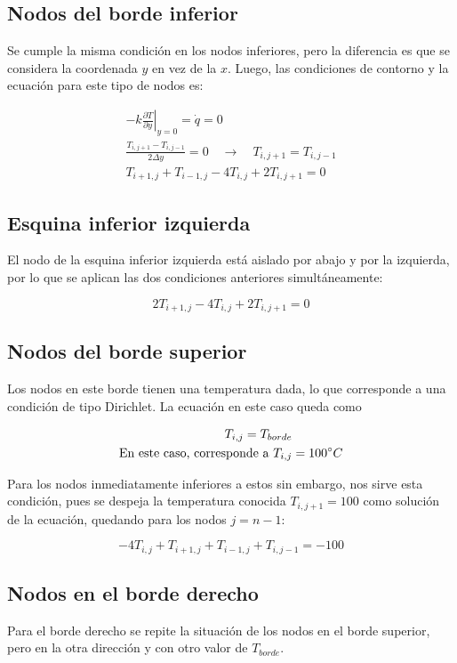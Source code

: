 \documentclass[12pt, notitlepage]{article}
\begin{document}
\subsection{Nodos del borde inferior}
Se cumple la misma condición en los nodos inferiores, pero la diferencia es que se considera la coordenada $y$ en vez de la $x$. Luego, las condiciones de contorno y la ecuación para este tipo de nodos es:

\begin{gather*}
-k\left.\frac{\partial T}{\partial y}\right|_{y = 0} = \dot{q} = 0 \\
\frac{T_{i,j+1} - T_{i,j-1}}{2\Delta y} = 0 \quad \longrightarrow\quad T_{i,j+1} = T_{i,j-1}\\
T_{i+1,j} + T_{i-1,j} - 4T_{i,j} + 2T_{i,j+1} = 0
\end{gather*}

\subsection{Esquina inferior izquierda}
El nodo de la esquina inferior izquierda está aislado por abajo y por la izquierda, por lo que se aplican las dos condiciones anteriores simultáneamente:

\begin{equation*}
2T_{i+1,j} - 4T_{i,j} + 2T_{i,j+1} = 0
\end{equation*}

\subsection{Nodos del borde superior}
Los nodos en este borde tienen una temperatura dada, lo que corresponde a una condición de tipo Dirichlet. La ecuación en este caso queda como

\begin{align*}
T_{i,j} = T_{borde}&\\
\text{En este caso, corresponde a}\ T_{i,j} &= 100\degree C
\end{align*}

Para los nodos inmediatamente inferiores a estos sin embargo, nos sirve esta condición, pues se despeja la temperatura conocida $T_{i,j+1} = 100$ como solución de la ecuación, quedando para los nodos $j=n-1$:

\begin{equation*}
-4T_{i,j} + T_{i+1,j} + T_{i-1,j} + T_{i,j-1} = -100
\end{equation*}

\subsection{Nodos en el borde derecho}
Para el borde derecho se repite la situación de los nodos en el borde superior, pero en la otra dirección y con otro valor de $T_{borde}$.
\end{document}
